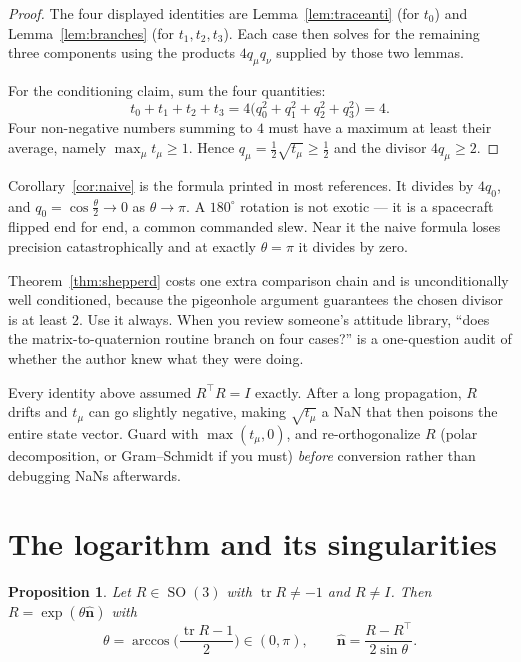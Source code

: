 \documentclass[11pt]{article}
\DeclareMathOperator{\tr}{tr}
\DeclareMathOperator{\SO}{SO}
\newcommand{\vv}[1]{\bm{#1}}
\newcommand{\hatmap}[1]{\widehat{#1}}
\newcommand{\halfth}{\tfrac{\theta}{2}}
\theoremstyle{plain}
\newtheorem{proposition}[theorem]{Proposition}
\theoremstyle{definition}
\begin{document}
\begin{proof}
The four displayed identities are Lemma~\ref{lem:traceanti} (for $t_0$) and
Lemma~\ref{lem:branches} (for $t_1,t_2,t_3$). Each case then solves for the remaining three
components using the products $4q_\mu q_\nu$ supplied by those two lemmas.

For the conditioning claim, sum the four quantities:
\[
t_0+t_1+t_2+t_3=4\big(q_0^2+q_1^2+q_2^2+q_3^2\big)=4 .
\]
Four non-negative numbers summing to $4$ must have a maximum at least their average, namely
$\max_\mu t_\mu\ge1$. Hence $q_\mu=\tfrac12\sqrt{t_\mu}\ge\tfrac12$ and the divisor
$4q_\mu\ge2$.
\end{proof}

\begin{practical}
Corollary~\ref{cor:naive} is the formula printed in most references. It divides by $4q_0$, and
$q_0=\cos\halfth\to0$ as $\theta\to\pi$. A $180^\circ$ rotation is not exotic --- it is a
spacecraft flipped end for end, a common commanded slew. Near it the naive formula loses precision
catastrophically and at exactly $\theta=\pi$ it divides by zero.

Theorem~\ref{thm:shepperd} costs one extra comparison chain and is unconditionally well
conditioned, because the pigeonhole argument guarantees the chosen divisor is at least $2$. Use it
always. When you review someone's attitude library, ``does the matrix-to-quaternion routine branch
on four cases?'' is a one-question audit of whether the author knew what they were doing.
\end{practical}

\begin{pitfall}
Every identity above assumed $R^{\!\top}R=I$ exactly. After a long propagation, $R$ drifts and
$t_\mu$ can go slightly negative, making $\sqrt{t_\mu}$ a NaN that then poisons the entire state
vector. Guard with $\max(t_\mu,0)$, and re-orthogonalize $R$ (polar decomposition, or Gram--Schmidt
if you must) \emph{before} conversion rather than debugging NaNs afterwards.
\end{pitfall}

\section{The logarithm and its singularities}

\begin{proposition}\label{prop:log}
Let $R\in\SO(3)$ with $\tr R\ne -1$ and $R\ne I$. Then $R=\exp(\theta\hatmap{\vv n})$ with
\[
\theta=\arccos\!\Big(\frac{\tr R-1}{2}\Big)\in(0,\pi),\qquad
\hatmap{\vv n}=\frac{R-R^{\!\top}}{2\sin\theta}.
\]
\end{proposition}
\end{document}
